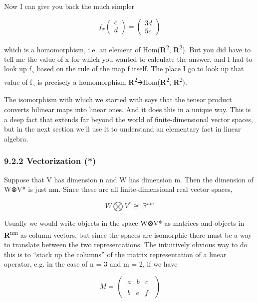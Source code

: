 \documentclass[oneside,english]{amsbook}
\numberwithin{section}{chapter}
\theoremstyle{plain}
\theoremstyle{definition}
\begin{document}
Now I can give you back the much simpler

\[f_{x}\begin{pmatrix}
	c \\
	d
\end{pmatrix} = \begin{pmatrix}
	3d \\
	5c
\end{pmatrix}\]

which is a homomorphism, i.e. an element of
Hom(\textbf{R}\textsuperscript{2}, \textbf{R}\textsuperscript{2}). But
you did have to tell me the value of x for which you wanted to calculate
the answer, and I had to look up f\textsubscript{x} based on the rule of
the map f itself. The place I go to look up that value of
f\textsubscript{x} is precisely a homomorphism
\textbf{R}\textsuperscript{2}🡪Hom(\textbf{R}\textsuperscript{2},
\textbf{R}\textsuperscript{2}).

The isomorphism with which we started with says that the tensor product
converts bilinear maps into linear ones. And it does this in a unique
way. This is a deep fact that extends far beyond the world of
finite-dimensional vector spaces, but in the next section we'll use it
to understand an elementary fact in linear algebra.

\subsubsection{9.2.2 Vectorization (*)}\label{vectorization}

Suppose that V has dimension n and W has dimension m. Then the dimension
of W⊗V* is just nm. Since these are all finite-dimensional real vector
spaces,

\[W\bigotimes V^{*} \cong \ \mathbb{R}^{nm}\]

Usually we would write objects in the space W⊗V* as matrices and objects
in \textbf{R}\textsuperscript{nm} as column vectors, but since the
spaces are isomorphic there must be a way to translate between the two
representations. The intuitively obvious way to do this is to ``stack up
the columns'' of the matrix representation of a linear operator, e.g. in
the case of n = 3 and m = 2, if we have

\[M = \begin{pmatrix}
	\begin{matrix}
		a & b & c
	\end{matrix} \\
	\begin{matrix}
		b & e & f
	\end{matrix}
\end{pmatrix}\]
\end{document}
